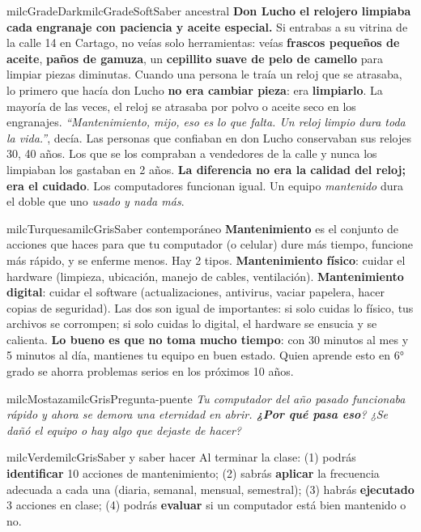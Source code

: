 \documentclass[11pt,letterpaper]{article}
\begin{document}
\begin{softbox}{milcGradeDark}{milcGradeSoft}{Saber ancestral}
\textbf{Don Lucho el relojero limpiaba cada engranaje con paciencia y aceite especial.} Si entrabas a su vitrina de la calle 14 en Cartago, no veías solo herramientas: veías \textbf{frascos pequeños de aceite}, \textbf{paños de gamuza}, un \textbf{cepillito suave de pelo de camello} para limpiar piezas diminutas. Cuando una persona le traía un reloj que se atrasaba, lo primero que hacía don Lucho \textbf{no era cambiar pieza}: era \textbf{limpiarlo}. La mayoría de las veces, el reloj se atrasaba por polvo o aceite seco en los engranajes. \emph{``Mantenimiento, mijo, eso es lo que falta. Un reloj limpio dura toda la vida.''}, decía. Las personas que confiaban en don Lucho conservaban sus relojes 30, 40 años. Los que se los compraban a vendedores de la calle y nunca los limpiaban los gastaban en 2 años. \textbf{La diferencia no era la calidad del reloj; era el cuidado}. Los computadores funcionan igual. Un equipo \emph{mantenido} dura el doble que uno \emph{usado y nada más}.
\end{softbox}

\begin{softbox}{milcTurquesa}{milcGris}{Saber contemporáneo}
\textbf{Mantenimiento} es el conjunto de acciones que haces para que tu computador (o celular) dure más tiempo, funcione más rápido, y se enferme menos. Hay 2 tipos. \textbf{Mantenimiento físico}: cuidar el hardware (limpieza, ubicación, manejo de cables, ventilación). \textbf{Mantenimiento digital}: cuidar el software (actualizaciones, antivirus, vaciar papelera, hacer copias de seguridad). Las dos son igual de importantes: si solo cuidas lo físico, tus archivos se corrompen; si solo cuidas lo digital, el hardware se ensucia y se calienta. \textbf{Lo bueno es que no toma mucho tiempo}: con 30 minutos al mes y 5 minutos al día, mantienes tu equipo en buen estado. Quien aprende esto en 6° grado se ahorra problemas serios en los próximos 10 años.
\end{softbox}

\begin{softbox}{milcMostaza}{milcGris}{Pregunta-puente}
\textit{Tu computador del año pasado funcionaba rápido y ahora se demora una eternidad en abrir. \textbf{¿Por qué pasa eso}? ¿Se dañó el equipo o hay algo que dejaste de hacer?}
\end{softbox}

\begin{softbox}{milcVerde}{milcGris}{Saber y saber hacer}
Al terminar la clase: (1) podrás \textbf{identificar} 10 acciones de mantenimiento; (2) sabrás \textbf{aplicar} la frecuencia adecuada a cada una (diaria, semanal, mensual, semestral); (3) habrás \textbf{ejecutado} 3 acciones en clase; (4) podrás \textbf{evaluar} si un computador está bien mantenido o no.
\end{softbox}
\end{document}
